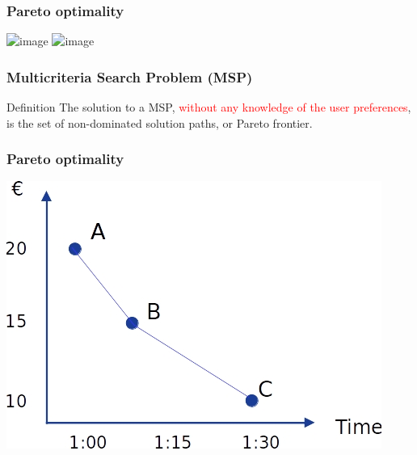 \begin{frame}
\frametitle{Pareto optimality}
	\begin{center}
		\includegraphics<1>[scale=0.5]{figs/pareto1}
		\includegraphics<2>[scale=0.5]{figs/pareto2}
	\end{center}
\note{
}
\end{frame}
\begin{frame} 
\frametitle{Multicriteria Search Problem (MSP)}
	\begin{block}{Definition}
		\vspace{1mm}
		The solution to a MSP, \textcolor{red}{without any knowledge of the user preferences}, is the set of \textcolor{ao}{non-dominated} solution paths, or \textcolor{ao}{Pareto frontier}.
		\vspace{1mm}
	\end{block}
\note{}
\end{frame}
\begin{frame}
\frametitle{Pareto optimality}
	\begin{center}
		\includegraphics[scale=0.5]{figs/pareto3}
	\end{center}
\note{
}
\end{frame}
